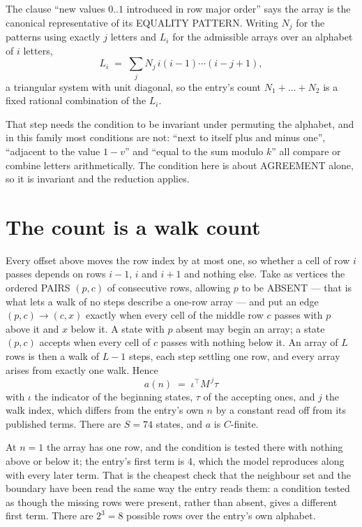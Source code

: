 \documentclass[11pt,a4paper]{article}
\theoremstyle{plain}
\theoremstyle{definition}
\begin{document}
The clause ``new values $0..1$ introduced in row major order'' says the array is the
canonical representative of its EQUALITY PATTERN. Writing $N_j$ for the patterns using exactly
$j$ letters and $L_i$ for the admissible arrays over an alphabet of $i$ letters,
\[
L_i\;=\;\sum_j N_j\,i(i-1)\cdots(i-j+1),
\]
a triangular system with unit diagonal, so the entry's count $N_1+\dots+N_{2}$ is a
fixed rational combination of the $L_i$.

That step needs the condition to be invariant under permuting the alphabet, and in this family
most conditions are not: ``next to itself plus and minus one'', ``adjacent to the value
$1-v$'' and ``equal to the sum modulo $k$'' all compare or combine letters arithmetically.
The condition here is about AGREEMENT alone, so it is invariant and the reduction applies.

\section{The count is a walk count}

Every offset above moves the row index by at most one, so whether a cell of row $i$ passes
depends on rows $i-1$, $i$ and $i+1$ and nothing else. Take as vertices the ordered PAIRS
$(p,c)$ of consecutive rows, allowing $p$ to be ABSENT --- that is what lets a walk of no steps
describe a one-row array --- and put an edge $(p,c)\to(c,x)$ exactly when every cell of the
middle row $c$ passes with $p$ above it and $x$ below it. A state with $p$ absent may begin an
array; a state $(p,c)$ accepts when every cell of $c$ passes with nothing below it. An array of
$L$ rows is then a walk of $L-1$ steps, each step settling one row, and every array arises from
exactly one walk. Hence
\[
a(n)\;=\;\iota^{\!\top}M^{\,j}\tau
\]
with $\iota$ the indicator of the beginning states, $\tau$ of the accepting ones, and $j$ the
walk index, which differs from the entry's own $n$ by a constant read off from its published
terms. There are $S=74$ states, and $a$ is $C$-finite.

At $n=1$ the array has one row, and
the condition is tested there with nothing above or below it; the entry's first term is
$4$, which the model reproduces along with every later term. That is the cheapest check
that the neighbour set and the boundary have been read the same way the entry reads them: a
condition tested as though the missing rows were present, rather than absent, gives a different
first term. There are $2^{3}=8$ possible rows over the entry's own alphabet.
\end{document}
